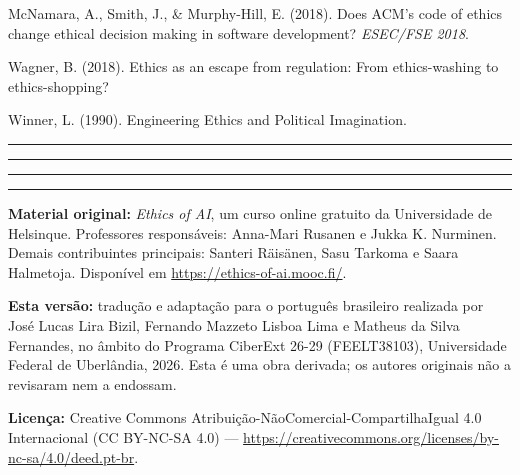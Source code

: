 \documentclass[
  11pt,
]{article}
\newcommand{\faixaEixos}[1][\linewidth]{%
  \noindent
  \textcolor{iaConceitos}{\rule{0.3333#1}{4pt}}%
  \textcolor{iaAplic}{\rule{0.3333#1}{4pt}}%
  \textcolor{iaRiscos}{\rule{0.3333#1}{4pt}}%
  \par}
\newenvironment{licenca}
  {\par\vspace{2em}\faixaEixos\par\vspace{0.8em}
   \begingroup\sffamily\scriptsize\color{iaTintaFraca}}
  {\endgroup\par}
\begin{document}
McNamara, A., Smith, J., \& Murphy-Hill, E. (2018). Does ACM's code of
ethics change ethical decision making in software development?
\emph{ESEC/FSE 2018}.

Wagner, B. (2018). Ethics as an escape from regulation: From
ethics-washing to ethics-shopping?

Winner, L. (1990). Engineering Ethics and Political Imagination.

\begin{center}\rule{0.5\linewidth}{0.5pt}\end{center}

\begin{licenca}

\textbf{Material original:} \emph{Ethics of AI}, um curso online
gratuito da Universidade de Helsinque. Professores responsáveis:
Anna-Mari Rusanen e Jukka K. Nurminen. Demais contribuintes principais:
Santeri Räisänen, Sasu Tarkoma e Saara Halmetoja. Disponível em
\url{https://ethics-of-ai.mooc.fi/}.

\textbf{Esta versão:} tradução e adaptação para o português brasileiro
realizada por José Lucas Lira Bizil, Fernando Mazzeto Lisboa Lima e
Matheus da Silva Fernandes, no âmbito do Programa CiberExt 26-29
(FEELT38103), Universidade Federal de Uberlândia, 2026. Esta é uma obra
derivada; os autores originais não a revisaram nem a endossam.

\textbf{Licença:} Creative Commons
Atribuição-NãoComercial-CompartilhaIgual 4.0 Internacional (CC BY-NC-SA
4.0) ---
\url{https://creativecommons.org/licenses/by-nc-sa/4.0/deed.pt-br}.

\end{licenca}
\end{document}
